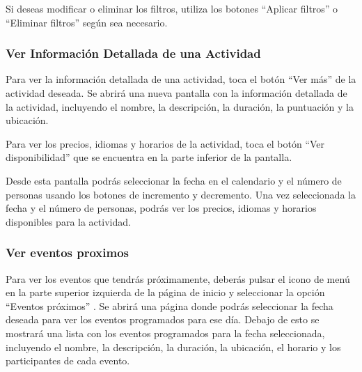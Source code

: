 Si deseas modificar o eliminar los filtros, utiliza los botones “Aplicar filtros” o “Eliminar filtros” según sea necesario.

\subsubsection{Ver Información Detallada de una Actividad}
Para ver la información detallada de una actividad, toca el botón “Ver más” de la actividad deseada. Se abrirá una nueva pantalla con la información detallada de la actividad, incluyendo el nombre, la descripción, la duración, la puntuación y la ubicación.

Para ver los precios, idiomas y horarios de la actividad, toca el botón “Ver disponibilidad” que se encuentra en la parte inferior de la pantalla.

Desde esta pantalla podrás seleccionar la fecha en el calendario y el número de personas usando los botones de incremento y decremento. Una vez seleccionada la fecha y el número de personas, podrás ver los precios, idiomas y horarios disponibles para la actividad.

\subsubsection{Ver eventos proximos}
Para ver los eventos que tendrás próximamente, deberás pulsar el icono de menú en la parte superior izquierda de la página de inicio y seleccionar la opción “Eventos próximos” .
Se abrirá una página donde podrás seleccionar la fecha deseada para ver los eventos programados para ese día.
Debajo de esto se mostrará una lista con los eventos programados para la fecha seleccionada, incluyendo el nombre, la descripción, la duración, la ubicación, el horario y los participantes de cada evento.


